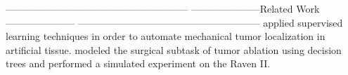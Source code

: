 --------------------------------------------------------
---------------------Related Work---------------------
--------------------------------------------------------
\cite{Nichols2013Autonomous} applied supervised learning techniques in order to automate mechanical tumor localization in artificial tissue.
\cite{Hu2015Semi} modeled the surgical subtask of tumor ablation using decision
trees and performed a simulated experiment on the Raven II.